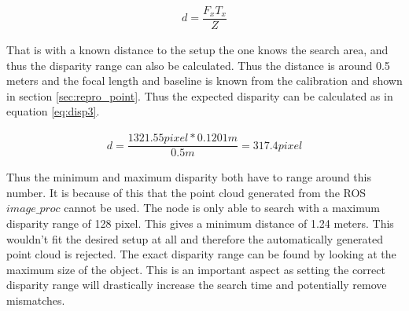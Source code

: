 \begin{equation}\label{eq:disp2}
\begin{split}
 d = \dfrac{F_{x}T_{x}}{ Z}
\end{split}
\end{equation} 

That is with a known distance to the setup the one knows the search area, and thus the disparity range can also be calculated. Thus the distance is around 0.5 meters and the focal length and baseline is known from the calibration and shown in section \ref{sec:repro_point}. Thus the expected disparity can be calculated as in equation \ref{eq:disp3}.

\begin{equation}\label{eq:disp3}
\begin{split}
d = \dfrac{1321.55 pixel*0.1201m}{0.5m} = 317.4 pixel
\end{split}
\end{equation}

Thus the minimum and maximum disparity both have to range around this number. It is because of this that the point cloud generated from the ROS $image\_proc$ cannot be used. The node is only able to search with a maximum disparity range of 128 pixel. This gives a minimum distance of 1.24 meters. This wouldn't fit the desired setup at all and therefore the automatically generated point cloud is rejected. The exact disparity range can be found by looking at the maximum size of the object. This is an important aspect as setting the correct disparity range will drastically increase the search time and potentially remove mismatches.